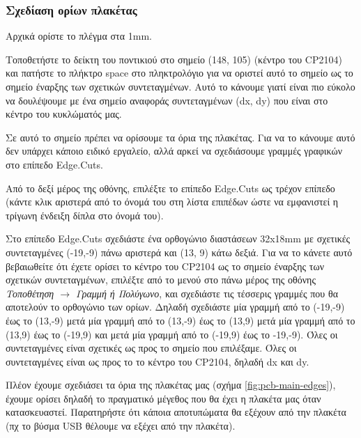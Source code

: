 \documentclass[a4paper]{article}
\begin{document}
\subsubsection{Σχεδίαση ορίων πλακέτας}
Αρχικά ορίστε το πλέγμα στα 1mm.

Τοποθετήστε το δείκτη του ποντικιού στο σημείο (148, 105) (κέντρο του CP2104) και πατήστε το πλήκτρο space στο πληκτρολόγιο για να οριστεί αυτό το σημείο ως το σημείο έναρξης των σχετικών συντεταγμένων. Αυτό το κάνουμε γιατί είναι πιο εύκολο να δουλέψουμε με ένα σημείο αναφοράς συντεταγμένων (dx, dy) που είναι στο κέντρο του κυκλώματός μας.

Σε αυτό το σημείο πρέπει να ορίσουμε τα όρια της πλακέτας. Για να το κάνουμε αυτό δεν υπάρχει κάποιο ειδικό εργαλείο, αλλά αρκεί να σχεδιάσουμε γραμμές γραφικών στο επίπεδο Edge.Cuts.

Από το δεξί μέρος της οθόνης, επιλέξτε το επίπεδο Edge.Cuts ως τρέχον επίπεδο (κάντε κλικ αριστερά από το όνομά του στη λίστα επιπέδων ώστε να εμφανιστεί η τρίγωνη ένδειξη δίπλα στο όνομά του). 

Στο επίπεδο Edge.Cuts σχεδιάστε ένα ορθογώνιο διαστάσεων 32x18mm με σχετικές συντεταγμένες (-19,-9) πάνω αριστερά και (13, 9) κάτω δεξιά. Για να το κάνετε αυτό βεβαιωθείτε ότι έχετε ορίσει το κέντρο του CP2104 ως το σημείο έναρξης των σχετικών συντεταγμένων, επιλέξτε από το μενού στο πάνω μέρος της οθόνης \textit{Τοποθέτηση $\rightarrow$ Γραμμή ή Πολύγωνο}, και σχεδιάστε τις τέσσερις γραμμές που θα αποτελούν το ορθογώνιο των ορίων. Δηλαδή σχεδιάστε μία γραμμή από το (-19,-9) έως το (13,-9) μετά μία γραμμή από το (13,-9) έως το (13,9) μετά μία γραμμή από το (13,9) έως το (-19,9) και μετά μία γραμμή από το (-19,9) έως το -19,-9). Όλες οι συντεταγμένες είναι σχετικές ως προς το σημείο που επιλέξαμε. Όλες οι συντεταγμένες είναι ως προς το το κέντρο του CP2104, δηλαδή dx και dy.  

Πλέον έχουμε σχεδιάσει τα όρια της πλακέτας μας (σχήμα \ref{fig:pcb-main-edges}), έχουμε ορίσει δηλαδή το πραγματικό μέγεθος που θα έχει η πλακέτα μας όταν κατασκευαστεί. Παρατηρήστε ότι κάποια αποτυπώματα θα εξέχουν από την πλακέτα (πχ το βύσμα USB θέλουμε να εξέχει από την πλακέτα).
\end{document}
